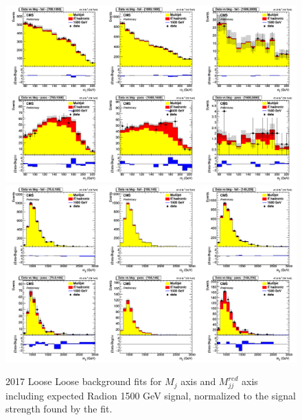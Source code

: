 \begin{figure}[!htb]
	\centering
	\includegraphics[width=1\textwidth]{Figures/postfit_projx_fits_17LL.png}
	\includegraphics[width=1\textwidth]{Figures/postfit_projy_fits_17LL.png}
	\caption{2017 Loose Loose background fits for $M_j$ axis and $M_{jj}^{red}$ axis including expected Radion 1500 GeV signal, normalized to the signal strength found by the fit.}
	\label{fig:17LL}
\end{figure}
